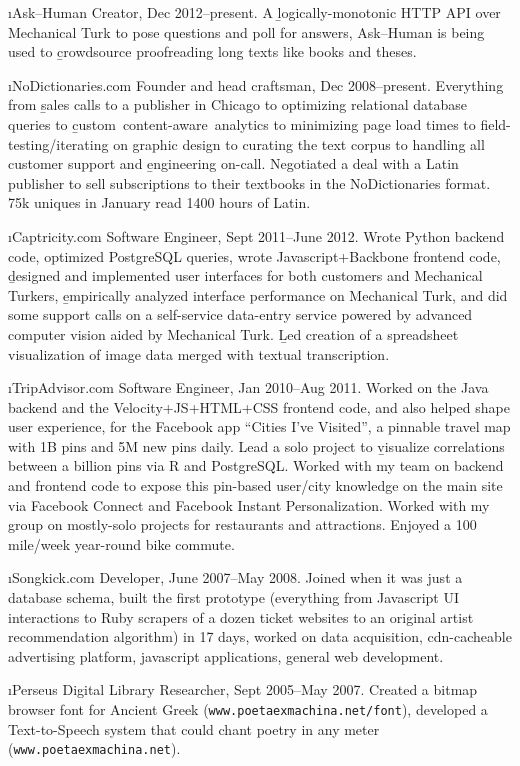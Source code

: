 \documentclass[11pt]{article}
\begin{document}
\i{Ask--Human} Creator, Dec 2012--present.
A \b{logically-monotonic HTTP API} over Mechanical Turk to pose questions and poll for answers, Ask--Human is being used to \b{crowdsource proofreading long texts} like books and theses.

\i{NoDictionaries.com} Founder and head craftsman, Dec 2008--present.
Everything from \b{sales calls to a publisher} in Chicago to optimizing relational database queries to \b{custom~content-aware~analytics} to minimizing page load times to field-testing/{iterating on graphic design} to curating the text corpus to handling all customer support and \b{engineering on-call}. Negotiated a deal with a Latin publisher to sell subscriptions to their textbooks in the NoDictionaries format.  75k uniques in January read 1400 hours of Latin.

\i{Captricity.com} Software Engineer, Sept 2011--June 2012.
Wrote Python backend code, optimized PostgreSQL queries, wrote Javascript+Backbone frontend code, \b{designed and implemented user interfaces} for both customers and Mechanical Turkers, \b{empirically analyzed interface performance} on Mechanical Turk, and did some support calls on a self-service data-entry service powered by advanced computer vision aided by Mechanical Turk. \b{Led creation of a spreadsheet visualization} of image data merged with textual transcription.

\i{TripAdvisor.com} Software Engineer, Jan 2010--Aug 2011.
Worked on the Java backend and the Velocity+JS+HTML+CSS frontend code, and also helped shape user experience, for the Facebook app ``Cities I've Visited'', a pinnable travel map with 1B pins and 5M new pins daily.  Lead a solo project to \b{visualize correlations between a billion pins} via R and PostgreSQL.  Worked with my team on backend and frontend code to expose this pin-based user/city knowledge on the main site via Facebook Connect and Facebook Instant Personalization.  Worked with my group on mostly-solo projects for restaurants and attractions.  Enjoyed a 100 mile/week year-round bike commute.

\i{Songkick.com} Developer, June 2007--May 2008.
Joined when it was just a database schema, built the first prototype (everything from Javascript UI interactions to Ruby scrapers of a dozen ticket websites to an original artist recommendation algorithm) in 17 days, worked on data acquisition, cdn-cacheable advertising platform, javascript applications, general web development.

\i{Perseus Digital Library} Researcher, Sept 2005--May 2007.
Created a bitmap browser font for Ancient Greek ({\tt www.poetaexmachina.net/font}), developed a Text-to-Speech system that could chant poetry in any meter (\texttt{www.poetaexmachina.net}).
\end{document}
